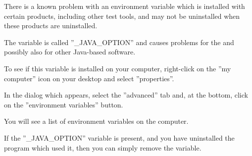 There is a known problem with an environment variable which is installed with certain products, including other test tools, and may not be uninstalled when these products are uninstalled. 

The variable is called ''\_JAVA\_OPTION'' and causes problems for the \ite{} and possibly also for other Java-based software.

To see if this variable is installed on your computer, right-click on the ''my computer'' icon on your desktop and select ''properties''. 

In the dialog which appears, select the ''advanced'' tab and, at the bottom, click on the ''environment variables'' button. 

You will see a list of environment variables on the computer. 

If the ''\_JAVA\_OPTION'' variable is present, and you have uninstalled the program which used it, then you can simply remove the variable.
